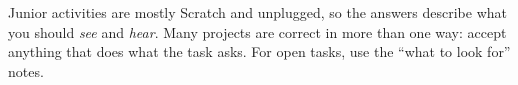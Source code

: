 \documentclass[track=junior,level=1,teacher]{kidscode}
\begin{document}

\begin{teachernote}
Junior activities are mostly Scratch and unplugged, so the answers describe what you should
\emph{see} and \emph{hear}. Many projects are correct in more than one way: accept anything that
does what the task asks. For open tasks, use the \enquote{what to look for} notes.
\end{teachernote}
\kcweeklytoc
{}
\end{document}
